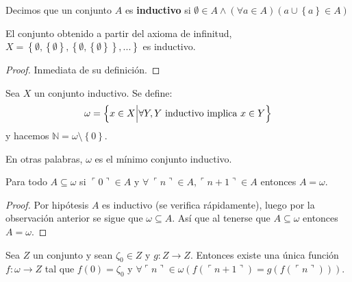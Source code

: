 \documentclass[12pt]{report}
\newcounter{it}
\theoremstyle{largebreak}
\newcommand\cf[3]{\ensuremath{#1:#2\rightarrow#3}}
\newcommand{\winecomma}[1]{\ensuremath{\ulcorner#1\urcorner}}
\begin{document}
    \begin{mydef}
        Decimos que un conjunto $A$ es \textbf{inductivo} si $\emptyset\in A\land(\forall a\in A)(a\cup\left\{a \right\}\in A)$ 
    \end{mydef}

    \begin{cor}
        El conjunto obtenido a partir del axioma de infinitud, $X=\left\{\emptyset,\left\{\emptyset \right\},\left\{\emptyset,\left\{\emptyset \right\}\right\},...\right\}$ es inductivo.
    \end{cor}

    \begin{proof}
        Inmediata de su definición.
    \end{proof}

    \begin{mydef}
        Sea $X$ un conjunto inductivo. Se define:
        \begin{equation*}
            \omega=\left\{x\in X\Big|\forall Y, Y\textup{ inductivo implica }x\in Y \right\}
        \end{equation*}
        y hacemos $\mathbb{N}=\omega\setminus\left\{0\right\}$.
    \end{mydef}

    \begin{obs}
        En otras palabras, $\omega$ es el mínimo conjunto inductivo.
    \end{obs}

    \begin{theor}
        Para todo $A\subseteq\omega$ si $\winecomma{0}\in A$ y $\forall\:\winecomma{n}\in A,\winecomma{n+1}\in A$ entonces $A=\omega$.
    \end{theor}

    \begin{proof}
        Por hipótesis $A$ es inductivo (se verifica rápidamente), luego por la observación anterior se sigue que $\omega\subseteq A$. Así que al tenerse que $A\subseteq\omega$ entonces $A=\omega$.
    \end{proof}

    \begin{theor}
        Sea $Z$ un conjunto y sean $\zeta_0\in Z$ y $\cf{g}{Z}{Z}$. Entonces existe una única función $\cf{f}{\omega}{Z}$ tal que $f(0)=\zeta_0$ y $\forall\winecomma{n}\in\omega(f(\winecomma{n+1})=g(f(\winecomma{n})))$.
    \end{theor}
\end{document}
